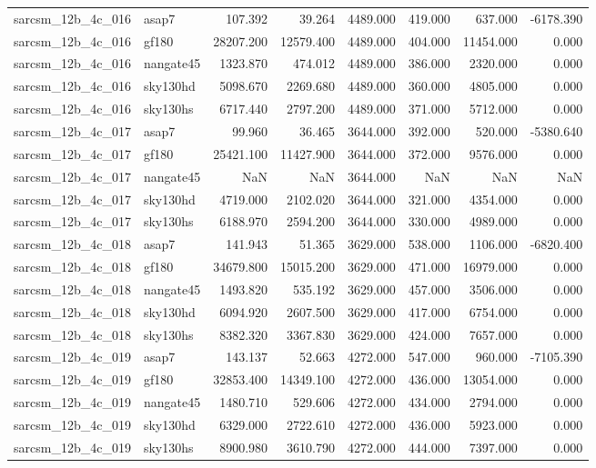 \begin{tabular}{llrrrrrr}
sarcsm\_12b\_4c\_016 & asap7 & 107.392 & 39.264 & 4489.000 & 419.000 & 637.000 & -6178.390 \\
sarcsm\_12b\_4c\_016 & gf180 & 28207.200 & 12579.400 & 4489.000 & 404.000 & 11454.000 & 0.000 \\
sarcsm\_12b\_4c\_016 & nangate45 & 1323.870 & 474.012 & 4489.000 & 386.000 & 2320.000 & 0.000 \\
sarcsm\_12b\_4c\_016 & sky130hd & 5098.670 & 2269.680 & 4489.000 & 360.000 & 4805.000 & 0.000 \\
sarcsm\_12b\_4c\_016 & sky130hs & 6717.440 & 2797.200 & 4489.000 & 371.000 & 5712.000 & 0.000 \\
sarcsm\_12b\_4c\_017 & asap7 & 99.960 & 36.465 & 3644.000 & 392.000 & 520.000 & -5380.640 \\
sarcsm\_12b\_4c\_017 & gf180 & 25421.100 & 11427.900 & 3644.000 & 372.000 & 9576.000 & 0.000 \\
sarcsm\_12b\_4c\_017 & nangate45 & NaN & NaN & 3644.000 & NaN & NaN & NaN \\
sarcsm\_12b\_4c\_017 & sky130hd & 4719.000 & 2102.020 & 3644.000 & 321.000 & 4354.000 & 0.000 \\
sarcsm\_12b\_4c\_017 & sky130hs & 6188.970 & 2594.200 & 3644.000 & 330.000 & 4989.000 & 0.000 \\
sarcsm\_12b\_4c\_018 & asap7 & 141.943 & 51.365 & 3629.000 & 538.000 & 1106.000 & -6820.400 \\
sarcsm\_12b\_4c\_018 & gf180 & 34679.800 & 15015.200 & 3629.000 & 471.000 & 16979.000 & 0.000 \\
sarcsm\_12b\_4c\_018 & nangate45 & 1493.820 & 535.192 & 3629.000 & 457.000 & 3506.000 & 0.000 \\
sarcsm\_12b\_4c\_018 & sky130hd & 6094.920 & 2607.500 & 3629.000 & 417.000 & 6754.000 & 0.000 \\
sarcsm\_12b\_4c\_018 & sky130hs & 8382.320 & 3367.830 & 3629.000 & 424.000 & 7657.000 & 0.000 \\
sarcsm\_12b\_4c\_019 & asap7 & 143.137 & 52.663 & 4272.000 & 547.000 & 960.000 & -7105.390 \\
sarcsm\_12b\_4c\_019 & gf180 & 32853.400 & 14349.100 & 4272.000 & 436.000 & 13054.000 & 0.000 \\
sarcsm\_12b\_4c\_019 & nangate45 & 1480.710 & 529.606 & 4272.000 & 434.000 & 2794.000 & 0.000 \\
sarcsm\_12b\_4c\_019 & sky130hd & 6329.000 & 2722.610 & 4272.000 & 436.000 & 5923.000 & 0.000 \\
sarcsm\_12b\_4c\_019 & sky130hs & 8900.980 & 3610.790 & 4272.000 & 444.000 & 7397.000 & 0.000 \\

\end{tabular}
